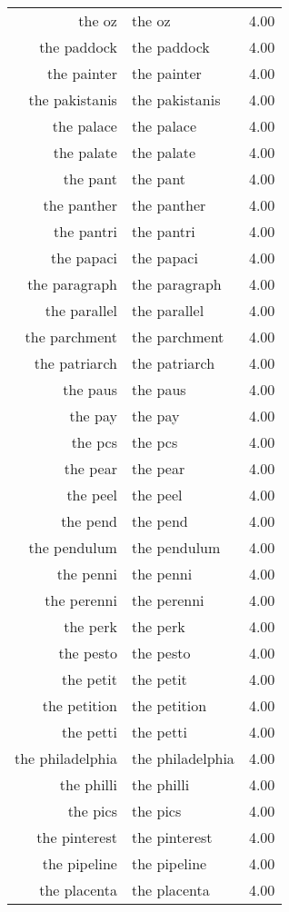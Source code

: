 \begin{table}[ht]
\begin{tabular}{rlr}
  the oz & the oz & 4.00 \\ 
  the paddock & the paddock & 4.00 \\ 
  the painter & the painter & 4.00 \\ 
  the pakistanis & the pakistanis & 4.00 \\ 
  the palace & the palace & 4.00 \\ 
  the palate & the palate & 4.00 \\ 
  the pant & the pant & 4.00 \\ 
  the panther & the panther & 4.00 \\ 
  the pantri & the pantri & 4.00 \\ 
  the papaci & the papaci & 4.00 \\ 
  the paragraph & the paragraph & 4.00 \\ 
  the parallel & the parallel & 4.00 \\ 
  the parchment & the parchment & 4.00 \\ 
  the patriarch & the patriarch & 4.00 \\ 
  the paus & the paus & 4.00 \\ 
  the pay & the pay & 4.00 \\ 
  the pcs & the pcs & 4.00 \\ 
  the pear & the pear & 4.00 \\ 
  the peel & the peel & 4.00 \\ 
  the pend & the pend & 4.00 \\ 
  the pendulum & the pendulum & 4.00 \\ 
  the penni & the penni & 4.00 \\ 
  the perenni & the perenni & 4.00 \\ 
  the perk & the perk & 4.00 \\ 
  the pesto & the pesto & 4.00 \\ 
  the petit & the petit & 4.00 \\ 
  the petition & the petition & 4.00 \\ 
  the petti & the petti & 4.00 \\ 
  the philadelphia & the philadelphia & 4.00 \\ 
  the philli & the philli & 4.00 \\ 
  the pics & the pics & 4.00 \\ 
  the pinterest & the pinterest & 4.00 \\ 
  the pipeline & the pipeline & 4.00 \\ 
  the placenta & the placenta & 4.00 \\ 

\end{tabular}
\end{table}
